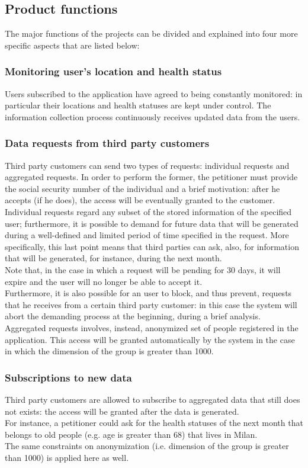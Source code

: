 \subsection{Product functions}
The major functions of the projects can be divided and explained into four more specific aspects that are listed below: 

\subsubsection{Monitoring user's location and health status}
Users subscribed to the application have agreed to being constantly monitored: in particular their locations and health statuses are kept under control. 
The information collection process continuously receives updated data from the users.\\

\subsubsection{Data requests from third party customers}
Third party customers can send two types of requests: individual requests and aggregated requests. 
In order to perform the former, the petitioner must provide the social security number of the individual and a brief motivation: after he accepts (if he does), the access will be eventually granted to the customer.
Individual requests regard any subset of the stored information of the specified user; furthermore, it is possible to demand for future data that will be generated during a well-defined and limited period of time specified in the request. 
More specifically, this last point means that third parties can ask, also, for information that will be generated, for instance, during the next month. \\
Note that, in the case in which a request will be pending for 30 days, it will expire and the user will no longer be able to accept it. \\
Furthermore, it is also possible for an user to block, and thus prevent, requests that he receives from a certain third party customer: in this case the system will abort the demanding process at the beginning, during a brief analysis.\\
Aggregated requests involves, instead, anonymized set of people registered in the application. 
This access will be granted automatically by the system in the case in which the dimension of the group is greater than 1000.   

\subsubsection{Subscriptions to new data}
Third party customers are allowed to subscribe to aggregated data that still does not exists: the access will be granted after the data is generated.\\
For instance, a petitioner could ask for the health statuses of the next month that belongs to old people (e.g. age is greater than 68) that lives in Milan. \\
The same constraints on anonymization (i.e. dimension of the group is greater than 1000) is applied here as well.

